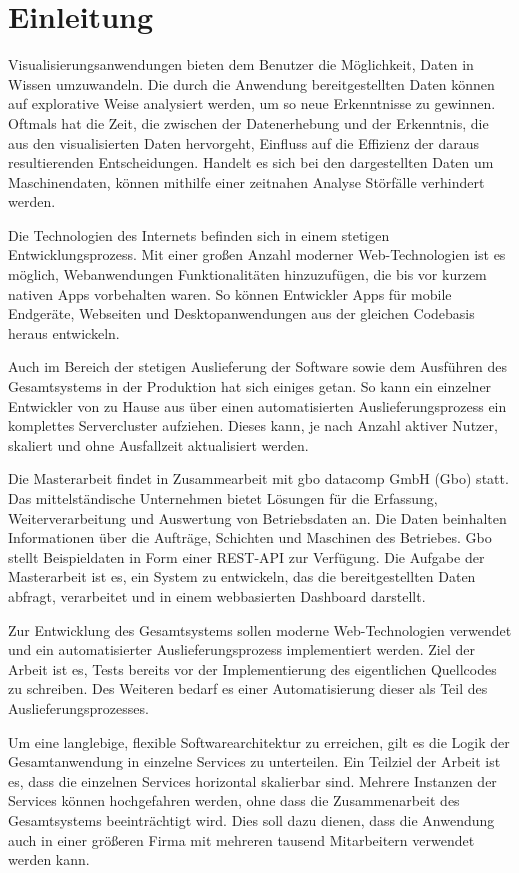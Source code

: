 \chapter{Einleitung}
\label{chap:einleitung}
Visualisierungsanwendungen bieten dem Benutzer die Möglichkeit,
Daten in Wissen umzuwandeln. Die durch die Anwendung bereitgestellten
Daten können auf explorative Weise analysiert werden, um so neue
Erkenntnisse zu gewinnen. Oftmals hat die Zeit, die zwischen der 
Datenerhebung und der Erkenntnis, die aus den visualisierten Daten hervorgeht,
Einfluss auf die Effizienz der daraus resultierenden Entscheidungen.
Handelt es sich bei den dargestellten Daten um Maschinendaten,
können mithilfe einer zeitnahen Analyse Störfälle verhindert werden.

Die Technologien des Internets befinden sich in einem stetigen Entwicklungsprozess.
Mit einer großen Anzahl moderner Web-Technologien ist es möglich, Webanwendungen Funktionalitäten
hinzuzufügen, die bis vor kurzem nativen Apps vorbehalten waren. So können Entwickler
Apps für mobile Endgeräte, Webseiten und Desktopanwendungen aus der gleichen Codebasis
heraus entwickeln.

Auch im Bereich der stetigen Auslieferung der Software sowie dem Ausführen des Gesamtsystems in der 
Produktion hat sich einiges getan. So kann ein einzelner Entwickler von zu Hause aus über einen automatisierten 
Auslieferungsprozess ein komplettes Servercluster aufziehen. Dieses kann, je nach Anzahl aktiver Nutzer, skaliert
und ohne Ausfallzeit aktualisiert werden.

Die Masterarbeit findet in Zusammearbeit mit gbo datacomp GmbH (Gbo) statt.
Das mittelständische Unternehmen bietet Lösungen für die Erfassung,
Weiterverarbeitung und Auswertung von Betriebsdaten an. Die Daten
beinhalten Informationen über die Aufträge, Schichten und Maschinen
des Betriebes. Gbo stellt Beispieldaten in Form einer REST-API
zur Verfügung. Die Aufgabe der Masterarbeit ist es, ein System zu entwickeln,
das die bereitgestellten Daten abfragt, verarbeitet und in einem webbasierten
Dashboard darstellt.

Zur Entwicklung des Gesamtsystems sollen moderne Web-Technologien verwendet
und ein automatisierter Auslieferungsprozess implementiert werden. Ziel der Arbeit ist es,
Tests bereits vor der Implementierung des eigentlichen Quellcodes zu schreiben. Des Weiteren 
bedarf es einer Automatisierung dieser als Teil des Auslieferungsprozesses. 

Um eine langlebige, flexible Softwarearchitektur zu erreichen, gilt es die Logik
der Gesamtanwendung in einzelne Services zu unterteilen. Ein Teilziel der Arbeit
ist es, dass die einzelnen Services horizontal skalierbar sind. Mehrere Instanzen
der Services können hochgefahren werden, ohne dass die Zusammenarbeit
des Gesamtsystems beeinträchtigt wird. Dies soll dazu dienen, dass die Anwendung
auch in einer größeren Firma mit mehreren tausend Mitarbeitern verwendet werden kann.

